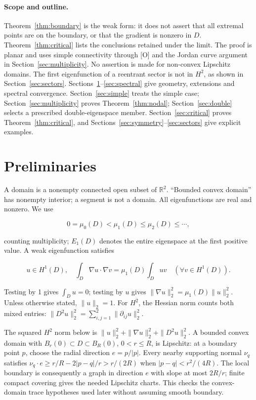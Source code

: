 \documentclass[11pt]{article}
\theoremstyle{definition}
\theoremstyle{remark}
\numberwithin{equation}{section}
\begin{document}
\paragraph{Scope and outline.}
Theorem~\ref{thm:boundary} is the weak form: it does not assert that all extremal points are on the boundary,
or that the gradient is nonzero in $D$. Theorem~\ref{thm:critical} lists the conclusions retained under the
limit. The proof is planar and uses simple connectivity through [O] and the Jordan curve argument in
Section~\ref{sec:multiplicity}. No assertion is made for non-convex Lipschitz domains. The first eigenfunction
of a reentrant sector is not in $H^2$, as shown in Section~\ref{sec:sectors}.
Sections~\ref{sec:prelim}--\ref{sec:spectral} give geometry, extensions and spectral convergence.
Section~\ref{sec:simple} treats the simple case; Section~\ref{sec:multiplicity} proves
Theorem~\ref{thm:nodal}; Section~\ref{sec:double} selects a prescribed double-eigenspace member.
Section~\ref{sec:critical} proves Theorem~\ref{thm:critical}, and
Sections~\ref{sec:symmetry}--\ref{sec:sectors} give explicit examples.


\section{Preliminaries}\label{sec:prelim}
A domain is a nonempty connected open subset of $\mathbb R^2$. “Bounded convex domain” has nonempty interior; a segment is not a domain. All eigenfunctions are real and nonzero. We use

\begin{equation}\label{eq:src-0-01}
0=\mu_0(D)<\mu_1(D)\leq\mu_2(D)\leq\cdots,
\end{equation}

counting multiplicity; $E_1(D)$ denotes the entire eigenspace at the first positive value. A weak eigenfunction satisfies

\begin{equation}\label{eq:src-0-02}
u\in H^1(D),\quad \int_D\nabla u\cdot\nabla v=\mu_1(D)\int_Duv\quad(\forall v\in H^1(D)).
\end{equation}

Testing by 1 gives $\int_Du=0$; testing by $u$ gives $\|\nabla u\|_2^2=\mu_1(D)\|u\|_2^2$. Unless otherwise stated, $\|u\|_2=1$. For $H^2$, the Hessian norm counts both mixed entries: $\|D^2u\|_2^2=\sum_{i,j=1}^2\|\partial_{ij}u\|_2^2$.

The squared $H^2$ norm below is $\|u\|_2^2+\|\nabla u\|_2^2+\|D^2u\|_2^2$. A bounded convex domain with $B_r(0)\subset D\subset B_R(0)$, $0<r\le R$, is Lipschitz: at a boundary point $p$, choose the radial direction $e=p/|p|$. Every nearby supporting normal $\nu_q$ satisfies $\nu_q\cdot e\ge r/R-2|p-q|/r>r/(2R)$ when $|p-q|<r^2/(4R)$. The local boundary is consequently a graph in direction $e$ with slope at most $2R/r$; finite compact covering gives the needed Lipschitz charts. This checks the convex-domain trace hypotheses used later without assuming smooth boundary.
\end{document}
